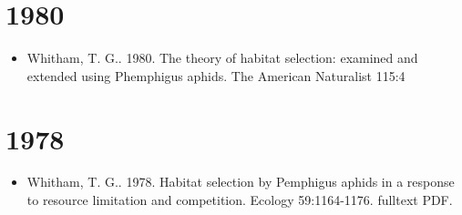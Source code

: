 \documentclass[12pt]{article}
\begin{document}
\section{1980}
\begin{itemize}
\item Whitham, T. G.. 1980. The theory of habitat selection: examined and
extended using Phemphigus aphids. The American Naturalist 115:4
\end{itemize}

\section{1978}
\begin{itemize}
\item Whitham, T. G.. 1978. Habitat selection by Pemphigus aphids in a
response to resource limitation and competition. Ecology
59:1164-1176. fulltext PDF.
\end{itemize}

\end{document}
